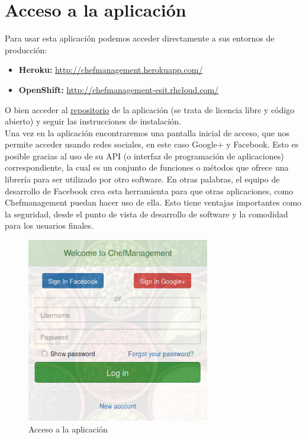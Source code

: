 \vspace*{0.2in}
\section{Acceso a la aplicación}\label{cap.2.1}

Para usar esta aplicación podemos acceder directamente a sus entornos de producción:
\begin{itemize}
	\item \textbf{Heroku:} \href{http://chefmanagement.herokuapp.com/}{http://chefmanagement.herokuapp.com/}
	\item \textbf{OpenShift:} \href{http://chefmanagement-esit.rhcloud.com/}{http://chefmanagement-esit.rhcloud.com/}
\end{itemize}


O bien acceder al \href{https://github.com/alu0100207385/ChefManagement}{repositorio} de la aplicación (se trata de licencia libre y código abierto) y seguir las instrucciones de instalación. \\

Una vez en la aplicación encontraremos una pantalla inicial de acceso, que nos permite acceder usando redes sociales, en este caso Google+ y Facebook. Esto es posible gracias al uso de su API (o interfaz de programación de aplicaciones) correspondiente, la cual es un conjunto de funciones o métodos que ofrece una librería para ser utilizado por otro software. En otras palabras, el equipo de desarrollo de Facebook crea esta herramienta para que otras aplicaciones, como Chefmanagement puedan hacer uso de ella. Esto tiene ventajas importantes como la seguridad, desde el punto de vista de desarrollo de software y la comodidad para los usuarios finales.

\begin{figure}[H]
	\centering
	\includegraphics[width=8cm]{./images/chefmanagement-root.png}
	\caption{Acceso a la aplicación} \label{fig:chefmanagement-root}
\end{figure}

